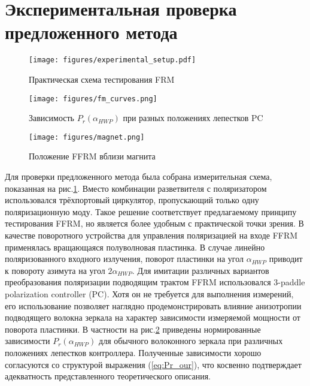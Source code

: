 \documentclass{article}
\begin{document}
\section{Экспериментальная проверка предложенного метода}
\begin{figure}[b]
	\centering
	\texttt{[image: figures/experimental\_setup.pdf]}
	\caption{Практическая схема тестирования FRM}
	\label{fig:experimantalScheme}
\end{figure}

\begin{figure}[b]
	\centering
	\texttt{[image: figures/fm\_curves.png]}
	\caption{Зависимость $P_r(\alpha_{HWP})$ при разных положениях лепестков PC}
	\label{fig:fm_curves}
\end{figure}

\begin{figure}[b]
	\centering
	\texttt{[image: figures/magnet.png]}
	\caption{Положение FFRM вблизи магнита}
	\label{fig:magnet}
\end{figure}

Для проверки предложенного метода была собрана измерительная схема, показанная на рис.\ref{fig:experimantalScheme}.
Вместо комбинации разветвителя с поляризатором использовался трёхпортовый циркулятор, пропускающий только одну поляризационную моду.
Такое решение соответствует предлагаемому принципу тестирования FFRM, но является более удобным с практической точки зрения.
В качестве поворотного устройства для управления поляризацией на входе FFRM применялась вращающаяся полуволновая пластинка.
В случае линейно поляризованного входного излучения, поворот пластинки на угол $\alpha_{HWP}$ приводит к повороту азимута на угол $2\alpha_{HWP}$. 
Для имитации различных вариантов преобразования поляризации подводящим трактом FFRM использовался 3-paddle polarization controller (PC).
Хотя он не требуется для выполнения измерений, его использование позволяет наглядно продемонстрировать влияние анизотропии подводящего волокна зеркала на характер зависимости измеряемой мощности от поворота пластинки.
В частности на рис.\ref{fig:fm_curves} приведены нормированные зависимости $P_r(\alpha_{HWP})$ для обычного волоконного зеркала при различных положениях лепестков контроллера.
Полученные зависимости хорошо согласуются со структурой выражения (\ref{eq:Pr_our}), что косвенно подтверждает адекватность представленного теоретического описания.
\end{document}
